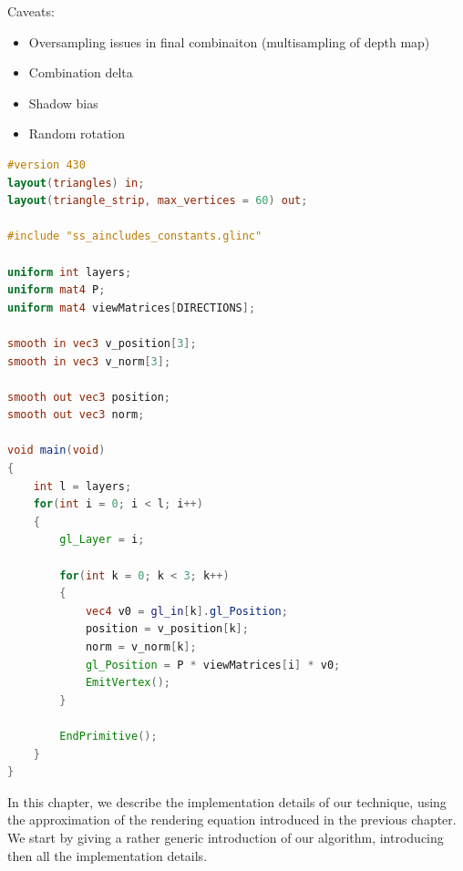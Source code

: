 Caveats:
\begin{itemize}
	\item Oversampling issues in final combinaiton (multisampling of depth map)
	\item Combination delta
	\item Shadow bias
  \item Random rotation
	
\end{itemize}

\begin{lstlisting}[language=GLSL,label=test,caption=Test!]
#version 430
layout(triangles) in;
layout(triangle_strip, max_vertices = 60) out;

#include "ss_aincludes_constants.glinc"

uniform int layers;
uniform mat4 P;
uniform mat4 viewMatrices[DIRECTIONS];

smooth in vec3 v_position[3];
smooth in vec3 v_norm[3];

smooth out vec3 position;
smooth out vec3 norm;

void main(void)
{
    int l = layers;
    for(int i = 0; i < l; i++)
    {
        gl_Layer = i;

        for(int k = 0; k < 3; k++)
        {
            vec4 v0 = gl_in[k].gl_Position;
            position = v_position[k];
            norm = v_norm[k];
            gl_Position = P * viewMatrices[i] * v0;
            EmitVertex();
        }

        EndPrimitive();
    }
}
\end{lstlisting}

In this chapter, we describe the implementation details of our technique, using the approximation of the rendering equation introduced in the previous chapter. We start by giving a rather generic introduction of our algorithm, introducing then all the implementation details. 


